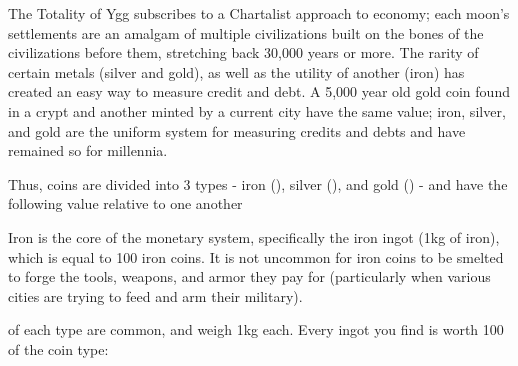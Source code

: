 
  The Totality of Ygg subscribes to a Chartalist approach to economy; each moon's settlements are an amalgam of multiple civilizations built on the bones of the civilizations before them, stretching back 30,000 years or more.  The rarity of certain metals (silver and gold), as well as the utility of another (iron) has created an easy way to measure credit and debt.  A 5,000 year old gold coin found in a crypt and another minted by a current city have the same value; iron, silver, and gold are the uniform system for measuring credits and debts and have remained so for millennia.  

  Thus, coins are divided into 3 types - iron (\FE), silver (\AG), and gold (\AU) - and have the following value relative to one another



\cbreak


  Iron is the core of the monetary system, specifically the iron ingot (1kg of iron), which is equal to 100 iron coins.  It is not uncommon for iron coins to be smelted to forge the tools, weapons, and armor they pay for (particularly when various cities are trying to feed and arm their military).  

   of each type are common, and weigh 1kg each.  Every ingot you find is worth 100 of the coin type:

